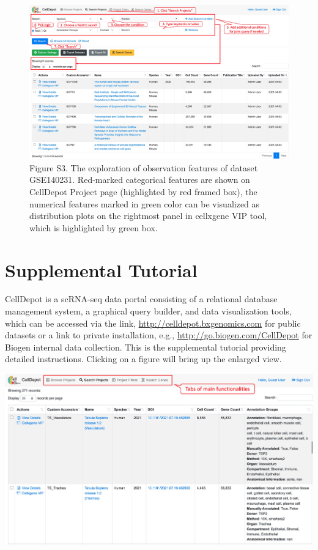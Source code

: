 \documentclass[
  openany]{book}
\begin{document}
\begin{figure}
\centering
\includegraphics{figures/S3.jpg}
\caption{Figure S3. The exploration of observation features of dataset GSE140231. Red-marked categorical features are shown on CellDepot Project page (highlighted by red framed box), the numerical features marked in green color can be visualized as distribution plots on the rightmost panel in cellxgene VIP tool, which is highlighted by green box.}
\end{figure}

\hypertarget{SITutorial}{%
\chapter{Supplemental Tutorial}\label{SITutorial}}

CellDepot is a scRNA-seq data portal consisting of a relational database management system, a graphical query builder, and data visualization tools, which can be accessed via the link, \url{http://celldepot.bxgenomics.com} for public datasets or a link to private installation, e.g., \url{http://go.biogen.com/CellDepot} for Biogen internal data collection. This is the supplemental tutorial providing detailed instructions. Clicking on a figure will bring up the enlarged view.

\href{figures/S1.jpg}{\includegraphics{figures/S1.jpg}}
\end{document}
